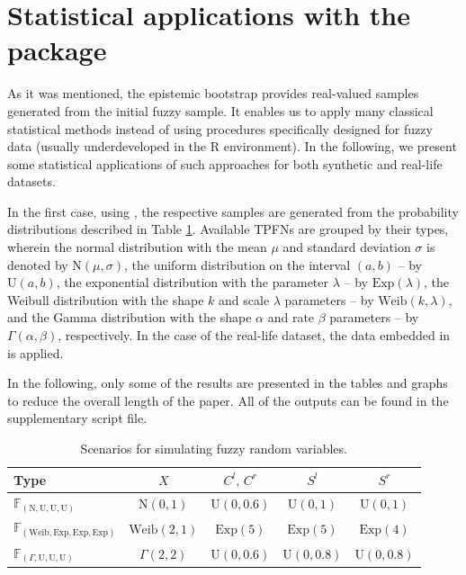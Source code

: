 

\section{Statistical applications with the package}


As it was mentioned, the epistemic bootstrap provides real-valued samples generated from the initial fuzzy sample. It enables us to apply many classical statistical methods instead of using procedures specifically designed for fuzzy data (usually underdeveloped in the R environment).
In the following, we present some statistical applications of such approaches for both synthetic and real-life datasets.

In the first case, using , the respective samples are generated from the probability distributions described in Table \ref{tab100}.
Available TPFNs are grouped by their types, wherein the normal distribution with the mean $\mu$ and standard deviation $\sigma$ is denoted by $\mathrm{N}(\mu,\sigma)$, the uniform distribution on the interval $(a,b)$ -- by $\mathrm{U}(a,b)$, the exponential distribution with the parameter $\lambda$ -- by $\mathrm{Exp}(\lambda)$, the Weibull distribution with the shape $k$ and scale $\lambda$ parameters -- by $\mathrm{Weib} (k,\lambda)$, and the Gamma distribution with the shape $\alpha$ and rate $\beta$ parameters  -- by $\Gamma (\alpha,\beta)$, respectively.
In the case of the real-life dataset, the data  embedded in  is applied.

In the following, only some of the results are presented in the tables and graphs to reduce the overall length of the paper.
All of the outputs can be found in the supplementary script file.

\begin{table}[htbp]
\centering

\begin{tabular}{l|cccc}
\hline
 Type & $X$ & $C^l,\, C^r$ & $S^l$ &  $ S^r$   \\
\hline
$\mathbb{F}_{(\mathrm{N,U,U,U})}$ & $\mathrm{N}(0,1)$ & $\mathrm{U}(0,0.6)$ &  $\mathrm{U}(0,1)$ &  $\mathrm{U}(0,1)$  \\
$\mathbb{F}_{(\mathrm{Weib,Exp,Exp,Exp})}$ & $\mathrm{Weib} (2,1)$ &  $\mathrm{Exp}(5)$ & $\mathrm{Exp}(5)$ & $\mathrm{Exp}(4)$\\
$\mathbb{F}_{(\Gamma,\mathrm{U,U,U})}$ & $\Gamma (2,2)$ & $\mathrm{U}(0,0.6)$ &  $\mathrm{U}(0,0.8)$ &  $\mathrm{U}(0,0.8)$  \\
\hline

\end{tabular}
\caption{Scenarios for simulating fuzzy random variables.}\label{tab100}
\end{table}


